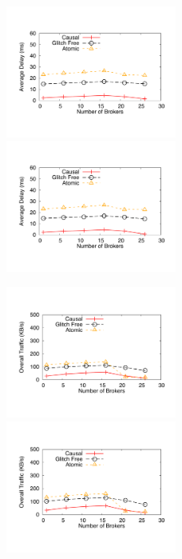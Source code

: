\documentclass[11pt]{article}
\begin{document}
\begin{figure}
	\includegraphics[width=0.5\textwidth]{graphs/numBrokersDelay}
	\includegraphics[width=0.5\textwidth]{referencegraphs/numBrokersDelay}
\end{figure}
\begin{figure}
	\includegraphics[width=0.5\textwidth]{graphs/numBrokersTraffic}
	\includegraphics[width=0.5\textwidth]{referencegraphs/numBrokersTraffic}
\end{figure}
\end{document}
